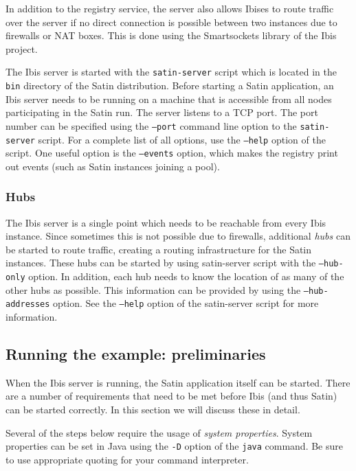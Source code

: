 \documentclass[a4paper,10pt]{article}
\begin{document}
In addition to the registry service, the server also allows
Ibises to route traffic over the server if no direct connection is
possible between two instances due to firewalls or NAT boxes. This is
done using the Smartsockets library of the Ibis project.

The Ibis server is started with the \texttt{satin-server} script which is
located in the \texttt{bin} directory of the Satin distribution.  Before
starting a Satin application, an Ibis server needs to be running on a
machine that is accessible from all nodes participating in the Satin run.
The server listens to a TCP port. The port number can be specified using
the \texttt{--port} command line option to the \texttt{satin-server}
script.  For a complete list of all options, use the \texttt{--help}
option of the script. One useful option is the  \texttt{--events}
option, which makes the registry print out events (such as Satin instances
joining a pool).

\subsubsection{Hubs}
\label{hubs}

The Ibis server is a single point which needs to be reachable from every
Ibis instance. Since sometimes this is not possible due to firewalls,
additional \emph{hubs} can be started to route traffic, creating a
routing infrastructure for the Satin instances. These hubs can be started
by using satin-server script with the \texttt{--hub-only} option. In
addition, each hub needs to know the location of as many of the other
hubs as possible. This information can be provided by using the
\texttt{--hub-addresses} option. See the \texttt{--help} option of the
satin-server script for more information.

\subsection{Running the example: preliminaries}

When the Ibis server is running, the Satin application itself can be
started.  There are a number of requirements that need to be met before
Ibis (and thus Satin) can be started correctly.
In this section we will discuss these in detail.

Several of the steps below require the usage of \emph{system properties}.
System properties can be set in Java using the \texttt{-D} option of the
\texttt{java} command. Be sure to use appropriate quoting for your
command interpreter.
\end{document}

